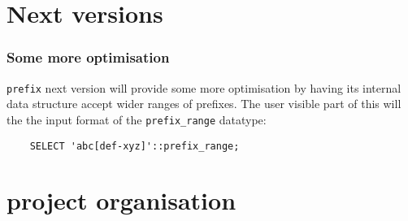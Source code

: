 \documentclass{beamer}
\begin{document}
\section{Next versions}

\begin{frame}[fragile]
  \frametitle{Some more optimisation}
  
  \texttt{prefix} next version will provide some more optimisation
  by having its internal data structure accept wider ranges of prefixes.
  The user visible part of this will the the input format of the \texttt{prefix\_range}
  datatype:
  
  \begin{example}
  \begin{verbatim}
    SELECT 'abc[def-xyz]'::prefix_range;
  \end{verbatim}
  \end{example}
\end{frame}

\section{project organisation}

\end{document}
